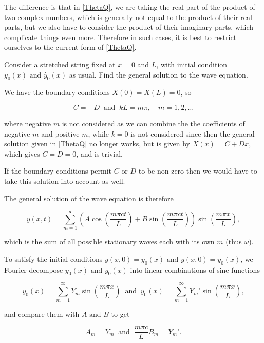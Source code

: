 \documentclass[a4paper,12pt]{report}
\begin{document}
The difference is that in \cref{ThetaQ}, we are taking the real part of the product of two complex numbers, which is generally not equal to the product of their real parts, but we also have to consider the product of their imaginary parts, which complicate things even more. Therefore in such cases, it is best to restrict ourselves to the current form of \cref{ThetaQ}.

{Consider a stretched string fixed at \(x=0\) and \(L\), with initial condition \(y_0 (x) \text { and }  \dot{y_0 }(x) \) as usual. Find the general solution to the wave equation. }
{We have the boundary conditions \(X(0) = X(L) = 0\), so

\begin{equation}
	C = - D ~\text { and }~ kL = m \pi , \quad m = 1,2,\ldots 
\end{equation}

where negative \(m\) is not considered as we can combine the the coefficients of negative \(m\) and positive \(m\), while \(k = 0\) is not considered since then the general solution given in \cref{ThetaQ} no longer works, but is given by \(X(x) = C + Dx\), which gives \(C = D = 0\), and is trivial.

If the boundary conditions permit \(C \text { or } D\) to be non-zero then we would have to take this solution into account as well. 

The general solution of the wave equation is therefore

\begin{equation}
	y(x,t) = \sum_{m=1}^{\infty}\left( A\cos \left( \frac{m \pi ct}{L}  \right) + B  \sin \left( \frac{m \pi ct}{L}  \right)  \right) \sin \left( \frac{m \pi x}{L}  \right),
\end{equation}

which is the sum of all possible stationary waves each with its own \(m\) (thus \(\omega \)).

To satisfy the initial conditions \(y(x,0) = y_0 (x) \text { and } \dot{y}(x,0) = \dot{y_0 }(x)  \), we Fourier decompose \(y_0 (x) \text { and } \dot{y_0 }(x) \) into linear combinations of sine functions 

\begin{equation}
	y_0 (x) = \sum_{m=1}^{\infty} Y_{m}\sin \left( \frac{m\pi x}{L}  \right) ~\text { and }~ \dot{y_0 }(x) = \sum_{m=1}^{\infty} Y_{m}' \sin \left( \frac{m \pi x}{L}  \right),   
\end{equation}

and compare them with \(A \text { and } B \) to get

\begin{equation}
	A_{m} = Y_{m} ~\text { and }~ \frac{m\pi c}{L} B_{m} = Y_{m}'.
\end{equation}}
\end{document}
